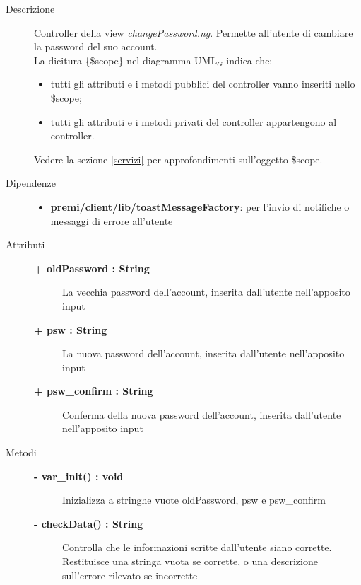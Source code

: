 \begin{description}
\item[Descrizione] \hfill
	Controller della view \textit{changePassword.ng}. Permette all'utente di cambiare la password del suo account.
	\\ La dicitura \{\$scope\} nel diagramma UML$_G$ indica che:
\begin{itemize}
\item tutti gli attributi e i metodi pubblici del controller vanno inseriti nello \$scope;
\item tutti gli attributi e i metodi privati del controller appartengono al controller.
\end{itemize}
Vedere la sezione \ref{servizi} per approfondimenti sull'oggetto \$scope.
	
	
	
\item[Dipendenze] \hfill
	\begin{itemize}
		\item \textbf{premi/client/lib/toastMessageFactory}: per l'invio di notifiche o messaggi di errore all'utente
	\end{itemize}
	
	
\item[Attributi] \hfill
	\begin{description}
		\item[\textbf{+ oldPassword : String			}] \hfill
			La vecchia password dell'account, inserita dall'utente nell'apposito input
		\item[\textbf{+ psw : String			}] \hfill
			La nuova password dell'account, inserita dall'utente nell'apposito input
		\item[\textbf{+ psw\_confirm : String			}] \hfill
			Conferma della nuova password dell'account, inserita dall'utente nell'apposito input
	\end{description}
	
	
\item[Metodi] \hfill

	\begin{description}
		\item[\textbf{\color{blue}- var\_init() : void			}] \hfill
			Inizializza a stringhe vuote oldPassword, psw e psw\_confirm
	\end{description}
	
	\begin{description}
		\item[\textbf{\color{blue}- checkData() : String			}] \hfill
			Controlla che le informazioni scritte dall'utente siano corrette. Restituisce una stringa vuota se corrette, o una descrizione sull'errore rilevato se incorrette
	\end{description}
	

\end{description}
